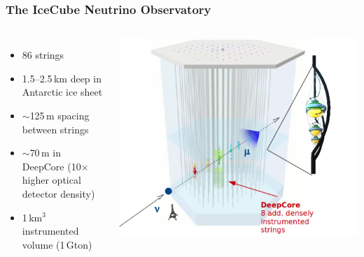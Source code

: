 \documentclass[xcolor=dvipsnames]{beamer}
\begin{document}
\begin{frame}
\begin{columns}[c]
\end{columns}

\end{frame}


\begin{frame}
\frametitle{The IceCube Neutrino Observatory}

\begin{columns}[c]
\begin{itemize}
\item 86 strings
\item 1.5--2.5\,km deep in Antarctic ice sheet
\item $\sim$125\,m spacing between strings
\item $\sim$70\,m in DeepCore (10$\times$ higher optical detector density)
\item 1\,km$^3$ instrumented volume (1\,Gton)
\end{itemize}
\includegraphics[width=\columnwidth]{icecube}
\end{columns}
\end{frame}
\end{document}
